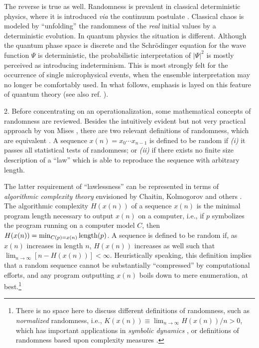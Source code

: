       The reverse is true as well.  Randomness is prevalent in
 classical deterministic physics, where it is introduced {\it via} the
 continuum postulate \cite{ford1}.  Classical chaos is modeled by
 ``unfolding'' the randomness of the {\sl real} initial values by a
 deterministic evolution.  In quantum physics the situation is
 different.  Although the quantum phase space is discrete and the
 Schr\"odinger equation for the wave function $\Psi$ is deterministic,
 the probabilistic interpretation of $\vert \Psi \vert^2$ is mostly
 perceived as introducing indeterminism.  This is most strongly felt
 for the occurrence of single microphysical events, when the ensemble
 interpretation may no longer be comfortably used.  In what follows,
 emphasis is layed on this feature of quantum theory (see also ref.
 \cite{eb1}).

      2. Before concentrating on an operationalization, some
 mathematical concepts of randomness are reviewed.  Besides the
 intuitively evident but not very practical approach by von Mises
 \cite{lam1,knuth1,svozil2}, there are two relevant definitions of
 randomness, which are equivalent \cite{chaitin2}.  A sequence
 $x(n)=x_0\cdots x_{n-1}$ is defined to be random if {\it (i)} it
 passes all
 statistical
 tests of randomness; or {\it (ii)} if there exists no finite size
 description of a ``law'' which is able to reproduce the sequence with
 arbitrary length.

      The latter requirement of ``lawlessness'' can be represented in
 terms of {\sl algorithmic complexity theory} envisioned by Chaitin,
 Kolmogorov and others \cite{chaitin1,chaitin2}.  The algorithmic
 complexity $H(x(n))$ of a sequence $x(n)$ is the minimal program
 length necessary to output $x(n)$ on a computer, i.e., if $p$
 symbolizes the program running on a computer model $C$, then
 $H(x(n))=\min_{C(p)=x(n)} {\rm length}(p)$.  A sequence is defined to
 be random if, as $x(n)$ increases in length $n$, $H(x(n))$ increases
 as well such that $\lim_{n\rightarrow \infty} [n-H(x(n))]<\infty$.
 Heuristically speaking, this definition implies that a random sequence
 cannot be substantially ``compressed'' by computational efforts, and
 any program outputting  $x(n)$ boils down to mere enumeration, at
 best.\footnote{ There is no space here to discuss different
 definitions of
 randomness, such as {\sl normalized} randomness, i.e., $K(x(n))\equiv
 \lim_{n\rightarrow \infty}H(x(n))/n>0$, which has important
 applications in {\sl symbolic dynamics} \cite{alekseev1,svozil1}, or
 definitions of randomness based upon complexity measures
 \cite{wolfram1,svozil2,svozil3}.}


